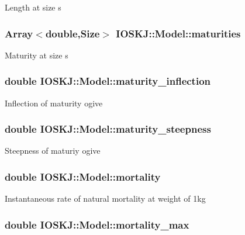 Length at size s \hypertarget{classIOSKJ_1_1Model_a374c4b48c908c40b7401e484cc49c767}{
\subsubsection[{maturities}]{\setlength{\rightskip}{0pt plus 5cm}Array$<$double,Size$>$ I\-O\-S\-K\-J\-::\-Model\-::maturities}}\label{classIOSKJ_1_1Model_a374c4b48c908c40b7401e484cc49c767}
Maturity at size s \hypertarget{classIOSKJ_1_1Model_aaba1b769dc8f413829f5fe639e978058}{
\subsubsection[{maturity\-\_\-inflection}]{\setlength{\rightskip}{0pt plus 5cm}double I\-O\-S\-K\-J\-::\-Model\-::maturity\-\_\-inflection}}\label{classIOSKJ_1_1Model_aaba1b769dc8f413829f5fe639e978058}
Inflection of maturity ogive \hypertarget{classIOSKJ_1_1Model_a7cbfb9cd8bd5be39c93302e1352d2ad2}{
\subsubsection[{maturity\-\_\-steepness}]{\setlength{\rightskip}{0pt plus 5cm}double I\-O\-S\-K\-J\-::\-Model\-::maturity\-\_\-steepness}}\label{classIOSKJ_1_1Model_a7cbfb9cd8bd5be39c93302e1352d2ad2}
Steepness of maturiy ogive \hypertarget{classIOSKJ_1_1Model_a970fad74268a92b08807a7cdbb32468b}{
\subsubsection[{mortality}]{\setlength{\rightskip}{0pt plus 5cm}double I\-O\-S\-K\-J\-::\-Model\-::mortality}}\label{classIOSKJ_1_1Model_a970fad74268a92b08807a7cdbb32468b}
Instantaneous rate of natural mortality at weight of 1kg \hypertarget{classIOSKJ_1_1Model_a7c6726c255509c23749664a82ed4c4a9}{
\subsubsection[{mortality\-\_\-max}]{\setlength{\rightskip}{0pt plus 5cm}double I\-O\-S\-K\-J\-::\-Model\-::mortality\-\_\-max}}\label{classIOSKJ_1_1Model_a7c6726c255509c23749664a82ed4c4a9}

